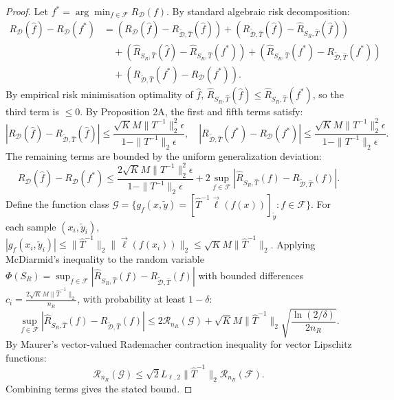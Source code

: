 \documentclass[11pt,onecolumn]{article}
\begin{document}
\begin{proof}
Let $f^* = \arg\min_{f \in \mathcal{F}} R_{\mathcal{D}}(f)$. By standard algebraic risk decomposition:
\begin{align}
R_{\mathcal{D}}(\hat{f}) - R_{\mathcal{D}}(f^*) &= \left( R_{\mathcal{D}}(\hat{f}) - R_{\tilde{\mathcal{D}}, \hat{T}}(\hat{f}) \right) + \left( R_{\tilde{\mathcal{D}}, \hat{T}}(\hat{f}) - \hat{R}_{S_R, \hat{T}}(\hat{f}) \right) \\
&\quad + \left( \hat{R}_{S_R, \hat{T}}(\hat{f}) - \hat{R}_{S_R, \hat{T}}(f^*) \right) + \left( \hat{R}_{S_R, \hat{T}}(f^*) - R_{\tilde{\mathcal{D}}, \hat{T}}(f^*) \right) \\
&\quad + \left( R_{\tilde{\mathcal{D}}, \hat{T}}(f^*) - R_{\mathcal{D}}(f^*) \right).
\end{align}
By empirical risk minimisation optimality of $\hat{f}$, $\hat{R}_{S_R, \hat{T}}(\hat{f}) \le \hat{R}_{S_R, \hat{T}}(f^*)$, so the third term is $\le 0$.
By Proposition 2A, the first and fifth terms satisfy:
\begin{equation}
|R_{\mathcal{D}}(\hat{f}) - R_{\tilde{\mathcal{D}}, \hat{T}}(\hat{f})| \le \frac{\sqrt{K} M \|T^{-1}\|_2^2 \epsilon}{1 - \|T^{-1}\|_2 \epsilon}, \quad |R_{\tilde{\mathcal{D}}, \hat{T}}(f^*) - R_{\mathcal{D}}(f^*)| \le \frac{\sqrt{K} M \|T^{-1}\|_2^2 \epsilon}{1 - \|T^{-1}\|_2 \epsilon}.
\end{equation}
The remaining terms are bounded by the uniform generalization deviation:
\begin{equation}
R_{\mathcal{D}}(\hat{f}) - R_{\mathcal{D}}(f^*) \le \frac{2 \sqrt{K} M \|T^{-1}\|_2^2 \epsilon}{1 - \|T^{-1}\|_2 \epsilon} + 2 \sup_{f \in \mathcal{F}} \left| \hat{R}_{S_R, \hat{T}}(f) - R_{\tilde{\mathcal{D}}, \hat{T}}(f) \right|.
\end{equation}
Define the function class $\mathcal{G} = \{g_f(x, \tilde{y}) = [\hat{T}^{-1} \vec{\ell}(f(x))]_{\tilde{y}} : f \in \mathcal{F}\}$. For each sample $(x_i, \tilde{y}_i)$, $|g_f(x_i, \tilde{y}_i)| \le \|\hat{T}^{-1}\|_2 \|\vec{\ell}(f(x_i))\|_2 \le \sqrt{K} M \|\hat{T}^{-1}\|_2$.
Applying McDiarmid's inequality to the random variable $\Phi(S_R) = \sup_{f \in \mathcal{F}} |\hat{R}_{S_R, \hat{T}}(f) - R_{\tilde{\mathcal{D}}, \hat{T}}(f)|$ with bounded differences $c_i = \frac{2 \sqrt{K} M \|\hat{T}^{-1}\|_2}{n_R}$, with probability at least $1 - \delta$:
\begin{equation}
\sup_{f \in \mathcal{F}} \left| \hat{R}_{S_R, \hat{T}}(f) - R_{\tilde{\mathcal{D}}, \hat{T}}(f) \right| \le 2 \mathcal{R}_{n_R}(\mathcal{G}) + \sqrt{K} M \|\hat{T}^{-1}\|_2 \sqrt{\frac{\ln(2/\delta)}{2 n_R}}.
\end{equation}
By Maurer's vector-valued Rademacher contraction inequality for vector Lipschitz functions:
\begin{equation}
\mathcal{R}_{n_R}(\mathcal{G}) \le \sqrt{2} L_{\ell, 2} \|\hat{T}^{-1}\|_2 \mathcal{R}_{n_R}(\mathcal{F}).
\end{equation}
Combining terms gives the stated bound.
\end{proof}
\end{document}
